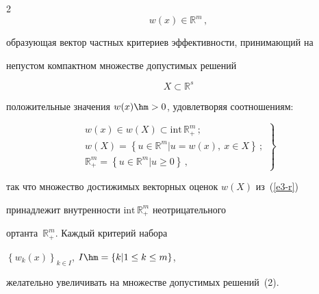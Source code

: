 \begin{multicols}{2}
\begin{equation}
  w(x)\in \mathbb{R}^m\,,


  \label{e1-r}


  \end{equation}


образующая вектор частных критериев эффективности, принимающий на 


непустом компактном множестве допустимых решений 


\begin{equation}


X\subset \mathbb{R}^s


\label{e2-r}


\end{equation}


положительные значения $w(x)\hm>0$, удовлетворяя соотношениям:


\begin{equation}


\left.


\begin{array}{c}


w(x)\in w(X)\subset \mathrm{int}\, \mathbb{R}_+^m\,;\\[3pt]


w(X)=\left\{ u\in \mathbb{R}^m\vert u=w(x),\ x\in X\right\}\,;\\[3pt]


\mathbb{R}_+^m =\left\{ u\in \mathbb{R}^m\vert u\geq 0\right\}\,,


\end{array}


\right\}


\label{e3-r}


\end{equation}


так что множество достижимых векторных оценок $w(X)$ из~(\ref{e3-r}) 


принадлежит внутренности $\mathrm{int}\, \mathbb{R}_+^m$ не\-от\-ри\-ца\-тель\-но\-го 


ортанта~$\mathbb{R}_+^m$. Каждый критерий набора




$\left\{ w_k(x)\right\}_{k\in I}$, $I\hm=\left\{ k\vert 1\leq k\leq m\right\}$,






желательно увеличивать на множестве допустимых решений~(2).



\end{multicols}
